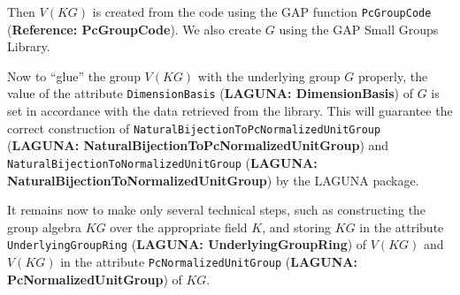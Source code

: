 \documentclass[a4paper,11pt]{report}
\begin{document}
{{ Then $V(KG)$ is created from the code using the \textsf{GAP} function \texttt{PcGroupCode} (\textbf{Reference: PcGroupCode}). We also create $G$ using the \textsf{GAP} Small Groups Library. 

 Now to ``glue'' the group $V(KG)$ with the underlying group $G$ properly, the value of the attribute \texttt{DimensionBasis} (\textbf{LAGUNA: DimensionBasis}) of $G$ is set in accordance with the data retrieved from the library. This will
guarantee the correct construction of \texttt{NaturalBijectionToPcNormalizedUnitGroup} (\textbf{LAGUNA: NaturalBijectionToPcNormalizedUnitGroup}) and \texttt{NaturalBijectionToNormalizedUnitGroup} (\textbf{LAGUNA: NaturalBijectionToNormalizedUnitGroup}) by the \textsf{LAGUNA} package. 

 It remains now to make only several technical steps, such as constructing the
group algebra $KG$ over the appropriate field $K$, and storing $KG$ in the attribute \texttt{UnderlyingGroupRing} (\textbf{LAGUNA: UnderlyingGroupRing}) of $V(KG)$ and $V(KG)$ in the attribute \texttt{PcNormalizedUnitGroup} (\textbf{LAGUNA: PcNormalizedUnitGroup}) of $KG$. }

 }

 
\end{document}

